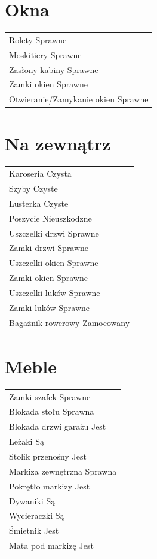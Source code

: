 \documentclass{article}
\begin{document}
\begin{multicols}{2}
\section{Okna}
\begin{tabularx}{\columnwidth}{|X|}
\hline
Rolety \dotfill Sprawne \\
Moskitiery \dotfill Sprawne \\
Zasłony kabiny \dotfill Sprawne \\
Zamki okien \dotfill Sprawne \\
Otwieranie/Zamykanie okien \dotfill Sprawne \\
\hline
\end{tabularx}

\section{Na zewnątrz}
\begin{tabularx}{\columnwidth}{|X|}
\hline
Karoseria \dotfill Czysta \\
Szyby \dotfill Czyste \\
Lusterka \dotfill Czyste \\
Poszycie \dotfill Nieuszkodzne \\
Uszczelki drzwi \dotfill Sprawne \\
Zamki drzwi \dotfill Sprawne \\
Uszczelki okien \dotfill Sprawne \\
Zamki okien \dotfill Sprawne \\
Uszczelki luków \dotfill Sprawne \\
Zamki luków \dotfill Sprawne \\
Bagażnik rowerowy \dotfill Zamocowany \\
\hline
\end{tabularx}


\section{Meble}
\begin{tabularx}{\columnwidth}{|X|}
\hline
Zamki szafek \dotfill Sprawne \\
Blokada stołu \dotfill Sprawna \\
Blokada drzwi garażu \dotfill Jest \\
Leżaki \dotfill Są \\
Stolik przenośny \dotfill Jest \\
Markiza zewnętrzna \dotfill Sprawna \\
Pokrętło markizy \dotfill Jest \\
Dywaniki \dotfill Są \\
Wycieraczki \dotfill Są \\
Śmietnik \dotfill Jest \\
Mata pod markizę \dotfill Jest \\
\hline
\end{tabularx}


\end{multicols}
\end{document}
